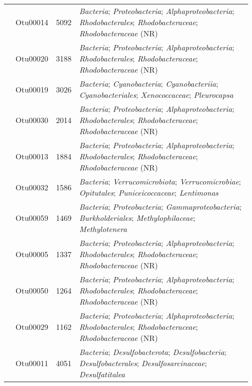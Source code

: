 \documentclass[
  12pt,
]{article}
\begin{document}
\begin{longtable}[t]{>{\centering\arraybackslash}m{8em}ccl}
\endfoot
\bottomrule
\endlastfoot
 & Otu00014 & 5092 & \textit{Bacteria}; \textit{Proteobacteria}; \textit{Alphaproteobacteria}; \textit{Rhodobacterales}; \textit{Rhodobacteraceae}; \textit{Rhodobacteraceae} (NR)\\
\nopagebreak
 & Otu00020 & 3188 & \textit{Bacteria}; \textit{Proteobacteria}; \textit{Alphaproteobacteria}; \textit{Rhodobacterales}; \textit{Rhodobacteraceae}; \textit{Rhodobacteraceae} (NR)\\
\nopagebreak
 & Otu00019 & 3026 & \textit{Bacteria}; \textit{Cyanobacteria}; \textit{Cyanobacteriia}; \textit{Cyanobacteriales}; \textit{Xenococcaceae}; \textit{Pleurocapsa}\\
\nopagebreak
 & Otu00030 & 2014 & \textit{Bacteria}; \textit{Proteobacteria}; \textit{Alphaproteobacteria}; \textit{Rhodobacterales}; \textit{Rhodobacteraceae}; \textit{Rhodobacteraceae} (NR)\\
\nopagebreak
 & Otu00013 & 1884 & \textit{Bacteria}; \textit{Proteobacteria}; \textit{Alphaproteobacteria}; \textit{Rhodobacterales}; \textit{Rhodobacteraceae}; \textit{Rhodobacteraceae} (NR)\\
\nopagebreak
 & Otu00032 & 1586 & \textit{Bacteria}; \textit{Verrucomicrobiota}; \textit{Verrucomicrobiae}; \textit{Opitutales}; \textit{Puniceicoccaceae}; \textit{Lentimonas}\\
\nopagebreak
 & Otu00059 & 1469 & \textit{Bacteria}; \textit{Proteobacteria}; \textit{Gammaproteobacteria}; \textit{Burkholderiales}; \textit{Methylophilaceae}; \textit{Methylotenera}\\
\nopagebreak
 & Otu00005 & 1337 & \textit{Bacteria}; \textit{Proteobacteria}; \textit{Alphaproteobacteria}; \textit{Rhodobacterales}; \textit{Rhodobacteraceae}; \textit{Rhodobacteraceae} (NR)\\
\nopagebreak
 & Otu00050 & 1264 & \textit{Bacteria}; \textit{Proteobacteria}; \textit{Alphaproteobacteria}; \textit{Rhodobacterales}; \textit{Rhodobacteraceae}; \textit{Rhodobacteraceae} (NR)\\
\nopagebreak
\multirow{-10}{8em}{\centering\arraybackslash \textit{Cymodocea nodosa} (Mixed)} & Otu00029 & 1162 & \textit{Bacteria}; \textit{Proteobacteria}; \textit{Alphaproteobacteria}; \textit{Rhodobacterales}; \textit{Rhodobacteraceae}; \textit{Rhodobacteraceae} (NR)\\
\cmidrule{1-4}\pagebreak[0]
 & Otu00011 & 4051 & \textit{Bacteria}; \textit{Desulfobacterota}; \textit{Desulfobacteria}; \textit{Desulfobacterales}; \textit{Desulfosarcinaceae}; \textit{Desulfatitalea}\\

\end{longtable}
\end{document}
